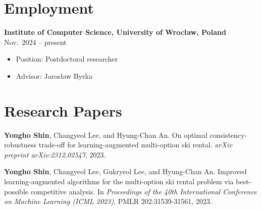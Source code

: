 \documentclass{article}
\newcommand{\killinitspace}{-0.7em}
\begin{document}
\section{Employment}
\textbf{Institute of Computer Science, University of Wrocław, Poland} \hfill Nov.~2024 -- present
\vspace{\killinitspace}
\begin{itemize}
\item Position: Postdoctoral researcher
\item Advisor: Jarosław Byrka
\end{itemize}

\section{Research Papers}
\textbf{Yongho Shin}, Changyeol Lee, and Hyung-Chan An. On optimal consistency-robustness trade-off for learning-augmented multi-option ski rental. \emph{arXiv preprint arXiv:2312.02547}, 2023.

\textbf{Yongho Shin}, Changyeol Lee, Gukryeol Lee, and Hyung-Chan An. Improved learning-augmented algorithms for the multi-option ski rental problem via best-possible competitive analysis. In \emph{Proceedings of the 40th International Conference on Machine Learning (ICML 2023)}, PMLR 202:31539-31561, 2023.
\end{document}
